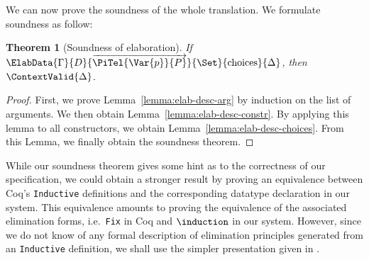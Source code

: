 \documentclass{scrartcl}
\theoremstyle{plain}
\newtheorem{theorem}{Theorem}
\theoremstyle{definition}
\newcommand{\ie}{i.e.\ }
\begin{document}
We can now prove the soundness of the whole translation. We
formulate soundness as follow:
\begin{theorem}[Soundness of elaboration]

If \(\ElabData{\Gamma}
              {D}
              {\overrightarrow{\PiTel{\Var{p}}{P}}}
              {\Set}
              {\mathrm{choices}}
              {\Delta}\), 
then \(\ContextValid{\Delta}\).

\end{theorem}
\begin{proof}

First, we prove Lemma~\ref{lemma:elab-desc-arg} by induction on the
list of arguments. We then obtain
Lemma~\ref{lemma:elab-desc-constr}. By applying this lemma to all
constructors, we obtain Lemma~\ref{lemma:elab-desc-choices}. From this
Lemma, we finally obtain the soundness theorem.

\end{proof}



While our soundness theorem gives some hint as to the correctness of
our specification, we could obtain a stronger result by proving an
equivalence between Coq's \texttt{Inductive} definitions and the
corresponding datatype declaration in our system. This equivalence
amounts to proving the equivalence of the associated elimination
forms, \ie \texttt{Fix} in Coq and \(\induction\) in our
system. However, since we do not know of any formal description of
elimination principles generated from an \texttt{Inductive}
definition, we shall use the simpler presentation given in
\citet{gimenez:coq-induction}.

\newcommand{\InterpretConstForm}[1]{\lfloor #1 \rfloor}
\end{document}
